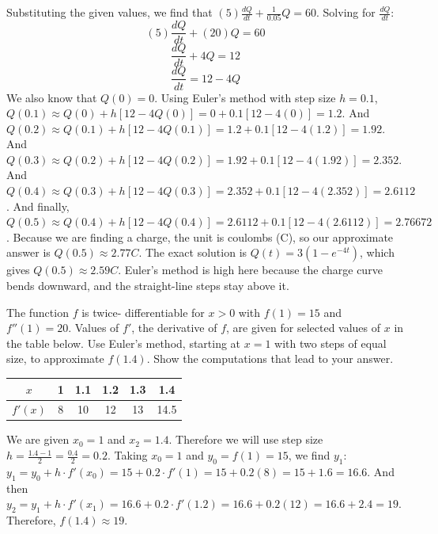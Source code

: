 \begin{Answer}[ref = eulercircuit]
Substituting the given values, we find that $(5)\frac{dQ}{dt} + \frac{1}{0.05}Q = 60$. Solving for $\frac{dQ}{dt}$:
$$(5) \frac{dQ}{dt} + (20)Q = 60$$
$$\frac{dQ}{dt} + 4Q = 12$$
$$\frac{dQ}{dt} = 12 - 4Q$$
We also know that $Q(0) = 0$. Using Euler's method with step size $h = 0.1$, $Q(0.1) \approx Q(0) + h \left[12 - 4Q(0) \right] = 0 + 0.1 \left[12 - 4(0) \right] = 1.2$. And $Q(0.2) \approx Q(0.1) + h \left[12 - 4Q(0.1) \right] = 1.2 + 0.1 \left[12 - 4(1.2) \right] = 1.92$. And $Q(0.3) \approx Q(0.2) + h \left[12 - 4Q(0.2) \right] = 1.92 + 0.1 \left[ 12 - 4(1.92) \right] = 2.352$. And $Q(0.4) \approx Q(0.3) + h \left[12 - 4Q(0.3) \right] = 2.352 + 0.1 \left[ 12 - 4(2.352) \right] = 2.6112$. And finally, $Q(0.5) \approx Q(0.4) + h \left[12 - 4Q(0.4) \right] = 2.6112 + 0.1 \left[12 - 4(2.6112) \right] = 2.76672$. Because we are finding a charge, the unit is coulombs (C), so our approximate answer is $Q(0.5) \approx 2.77 C$. The exact solution is $Q(t) = 3(1 - e^{-4t})$, which gives $Q(0.5) \approx 2.59 C$. Euler's method is high here because the charge curve bends downward, and the straight-line steps stay above it.
\end{Answer}

\begin{Exercise} The function $f$ is twice-
differentiable for $x > 0$ with $f(1) = 15$ and $f''(1) = 20$. Values of $f'$, 
the derivative of $f$, are given for selected values of $x$ in the table 
below. Use Euler's method, starting at $x = 1$ with two steps of equal size, 
to approximate $f(1.4)$. Show the computations that lead to your answer. 
	\begin{center}
		\begin{tabular}{|c|c|c|c|c|c|}\hline
		$x$ & 1 & 1.1 & 1.2 & 1.3 & 1.4\\\hline
		$f'(x)$ & 8 & 10 & 12 & 13 & 14.5\\\hline
		\end{tabular}
	\end{center}
\end{Exercise} 

\begin{Answer}[ref = euler1]
We are given $x_0 = 1$ and $x_2 = 1.4$. Therefore we will use step size $h = 
\frac{1.4 - 1}{2} = \frac{0.4}{2} = 0.2$. Taking $x_0 = 1$ and $y_0 = f(1) = 
15$, we find $y_1$: $y_1 = y_0 + h \cdot f'(x_0) = 15 + 0.2 \cdot f'(1) = 15 + 
0.2(8) = 15 + 1.6 = 16.6$. And then $y_2 = y_1 + h \cdot f'(x_1) = 16.6 + 0.2 
\cdot f'(1.2) = 16.6 + 0.2(12) = 16.6 + 2.4 = 19$. Therefore, $f(1.4) \approx 
19$. 
\end{Answer}